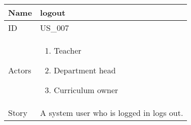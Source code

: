 \documentclass{article}
\newcommand\addrow[2]{#1 &#2\\ }
\newcommand\tabularhead{\begin{tabular}{lp{8cm}}
		\hline
	}
\newcommand\addmulrow[2]{ \begin{minipage}[t][][t]{2.5cm}#1\end{minipage}%
		&\begin{minipage}[t][][t]{8cm}
			\begin{enumerate} #2   \end{enumerate}
		\end{minipage}\\ }
\newenvironment{usecase}{\tabularhead}
	{\hline\end{tabular}}
\begin{document}
	\begin{usecase}
		\addrow{Name}{logout}
		\hline
		\addrow{ID}{US\_007}
		\hline
 		\addmulrow{Actors}{	\item Teacher
 							\item Department head
 							\item Curriculum owner}
		\hline		
		\addrow{Story}{A system user who is logged in logs out.}
								

	\end{usecase}
	
\end{document}
